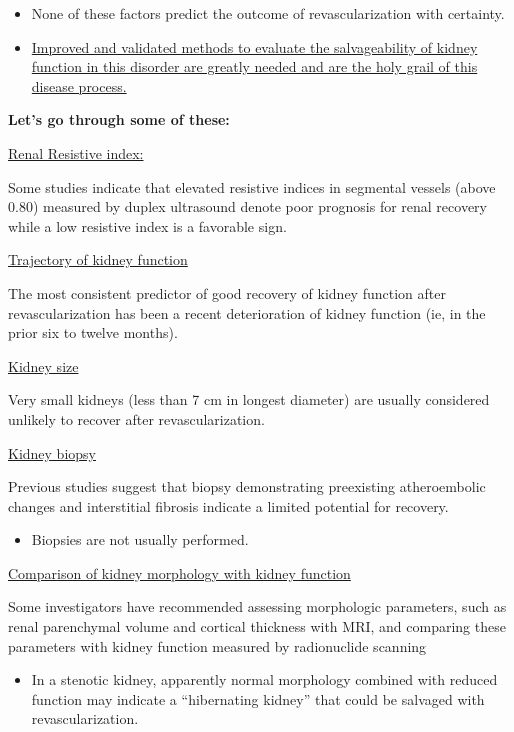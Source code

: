 \documentclass[
]{book}
\providecommand{\tightlist}{%
  \setlength{\itemsep}{0pt}\setlength{\parskip}{0pt}}
\begin{document}
\begin{itemize}
\item
  None of these factors predict the outcome of revascularization with
  certainty.
\item
  \underline{Improved and validated methods to evaluate the salvageability of
  kidney function in this disorder are greatly needed and are the holy
  grail of this disease process.}
\end{itemize}

\textbf{Let's go through some of these:}

\underline{Renal Resistive index:}

Some studies indicate that elevated resistive indices in segmental
vessels (above 0.80) measured by duplex ultrasound denote poor prognosis
for renal recovery while a low resistive index is a favorable sign.

\underline{Trajectory of kidney function}

The most consistent predictor of good recovery of kidney function after
revascularization has been a recent deterioration of kidney function
(ie, in the prior six to twelve months).

\underline{Kidney size}

Very small kidneys (less than 7 cm in longest diameter) are usually
considered unlikely to recover after revascularization.

\underline{Kidney biopsy}

Previous studies suggest that biopsy demonstrating preexisting
atheroembolic changes and interstitial fibrosis indicate a limited
potential for recovery.

\begin{itemize}
\tightlist
\item
  Biopsies are not usually performed.
\end{itemize}

\underline{Comparison of kidney morphology with kidney function}

Some investigators have recommended assessing morphologic parameters,
such as renal parenchymal volume and cortical thickness with MRI, and
comparing these parameters with kidney function measured by radionuclide
scanning

\begin{itemize}
\tightlist
\item
  In a stenotic kidney, apparently normal morphology combined with
  reduced function may indicate a ``hibernating kidney'' that could be
  salvaged with revascularization.
\end{itemize}
\end{document}
